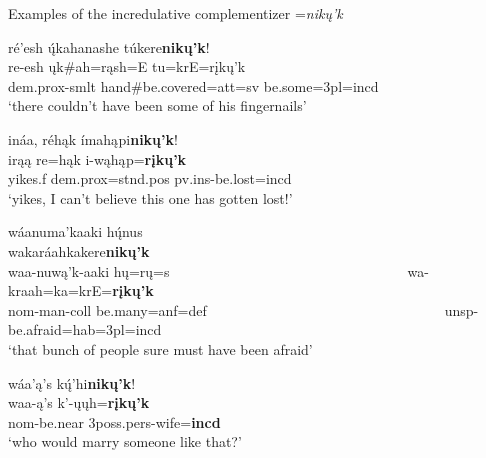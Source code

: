 \begin{exe}

\item\label{nikukexamples} Examples of the incredulative complementizer =\textit{nikų'k}

	\begin{xlist}
	
	\item\label{nikukexamples1} 
	\glll ré'esh ų́kahanashe túkere\textbf{nikų'k}!\\
	re-esh ųk\#ah=rąsh=E tu=krE=rįkų'k\\
	dem.prox-smlt \textnormal{hand}\#\textnormal{be.covered}=att=sv \textnormal{be.some}=3pl=incd\\
	\glt `there couldn't have been some of his fingernails' \citep[150]{hollow1973a}

	\item\label{nikukexamples2} 
	\glll ináa, réhąk ímahąpi\textbf{nikų'k}!\\
	irąą re=hąk i-wąhąp=\textbf{rįkų'k}\\
	\textnormal{yikes}.f dem.prox=stnd.pos pv.ins-\textnormal{be.lost}=incd\\
	\glt `yikes, I can't believe this one has gotten lost!' \citep[172]{hollow1973a}

	\item\label{nikukexamples3} 
	\glll wáanuma'kaaki hų́nus ~ ~ ~ ~ ~ ~ ~ ~ ~ ~ ~ ~ ~ ~ ~ ~ ~ ~ ~ ~ wakaráahkakere\textbf{nikų'k}\\
	waa-nuwą'k-aaki hų=rų=s ~ ~ ~ ~ ~ ~ ~ ~ ~ ~ ~ ~ ~ ~ ~ ~ ~ ~ ~ ~ wa-kraah=ka=krE=\textbf{rįkų'k}\\
	nom-\textnormal{man}-coll \textnormal{be.many}=anf=def ~ ~ ~ ~ ~ ~ ~ ~ ~ ~ ~ ~ ~ ~ ~ ~ ~ ~ ~ ~ unsp-\textnormal{be.afraid}=hab=3pl=incd\\
	\glt `that bunch of people sure must have been afraid' \citep[178]{hollow1973a}

	\item\label{nikukexamples4} 
	\glll wáa'ą's kų́'hi\textbf{nikų'k}!\\
	waa-ą's k'-ųųh=\textbf{rįkų'k}\\
	nom-\textnormal{be.near} 3poss.pers-\textnormal{wife}=\textbf{incd}\\
	\glt `who would marry someone like that?' \citep[20]{kennard1936}
	
	\end{xlist}

\end{exe}

